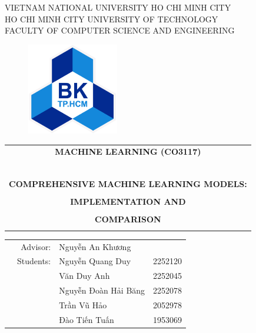 \begin{titlepage}
\begin{center}
VIETNAM NATIONAL UNIVERSITY HO CHI MINH CITY  \\
HO CHI MINH CITY UNIVERSITY OF TECHNOLOGY\\
FACULTY OF COMPUTER SCIENCE AND ENGINEERING
\end{center}

\begin{figure}[h!]
\begin{center}
\includegraphics[width=4cm]{Images/bachkhoa_logo.png}
\end{center}
\end{figure}

\begin{center}
\begin{tabular}{c}
\multicolumn{1}{c}{\textbf{{\LARGE MACHINE LEARNING (CO3117)}}}\\
~~\\
\hline
\\
\multicolumn{1}{c}{\textbf{{\Large COMPREHENSIVE MACHINE LEARNING MODELS:}}}\\
\\
\textbf{{\Huge IMPLEMENTATION AND}}\\
\\
\textbf{{\Huge COMPARISON}}\\
\\
\hline
\end{tabular}
\end{center}

\vspace{1.5cm}

\begin{table}[h]
\begin{tabular}{rrll}

\hspace{5 cm} & Advisor: & Nguyễn An Khương&\\

& Students:&  
 	
    Nguyễn Quang Duy& 2252120\\
& & Văn Duy Anh& 2252045\\
& & Nguyễn Đoàn Hải Băng& 2252078\\
& & Trần Vũ Hảo& 2052978\\
 & & Đào Tiến Tuấn&1953069\\


\end{tabular}
\end{table}
\end{titlepage}
